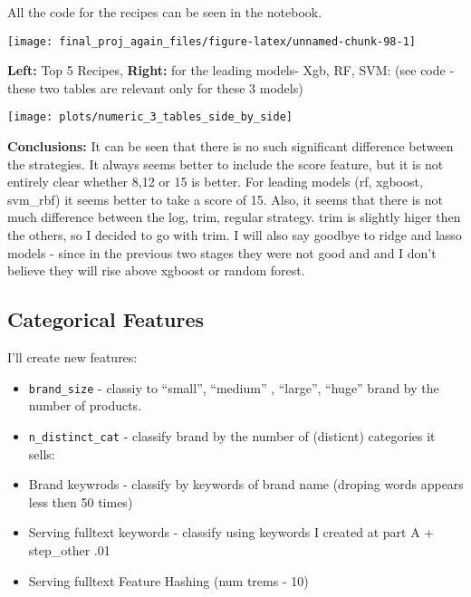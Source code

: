 \documentclass[
]{article}
\providecommand{\tightlist}{%
  \setlength{\itemsep}{0pt}\setlength{\parskip}{0pt}}
\begin{document}
All the code for the recipes can be seen in the notebook.

\begin{center}\texttt{[image: final\_proj\_again\_files/figure-latex/unnamed-chunk-98-1]} \end{center}

\captionsetup[table]{labelformat=empty}

\textbf{Left:} Top 5 Recipes, \textbf{Right:} for the leading models-
Xgb, RF, SVM: (see code - these two tables are relevant only for these 3
models)

\captionsetup[table]{labelformat=empty}

\begin{center}\texttt{[image: plots/numeric\_3\_tables\_side\_by\_side]} \end{center}

\textbf{Conclusions:} It can be seen that there is no such significant
difference between the strategies. It always seems better to include the
score feature, but it is not entirely clear whether 8,12 or 15 is
better. For leading models (rf, xgboost, svm\_rbf) it seems better to
take a score of 15. Also, it seems that there is not much difference
between the log, trim, regular strategy. trim is slightly higer then the
others, so I decided to go with trim. I will also say goodbye to ridge
and lasso models - since in the previous two stages they were not good
and and I don't believe they will rise above xgboost or random forest.

\hypertarget{categorical-features}{%
\subsection{Categorical Features}\label{categorical-features}}

I'll create new features:

\begin{itemize}
\tightlist
\item
  \texttt{brand\_size} - classiy to ``small'', ``medium'' , ``large'',
  ``huge'' brand by the number of products.
\item
  \texttt{n\_distinct\_cat} - classify brand by the number of (disticnt)
  categories it sells:
\item
  Brand keywrods - classify by keywords of brand name (droping words
  appears less then 50 times)
\item
  Serving fulltext keywords - classify using keywords I created at part
  A + step\_other .01
\item
  Serving fulltext Feature Hashing (num trems - 10)
\end{itemize}
\end{document}
